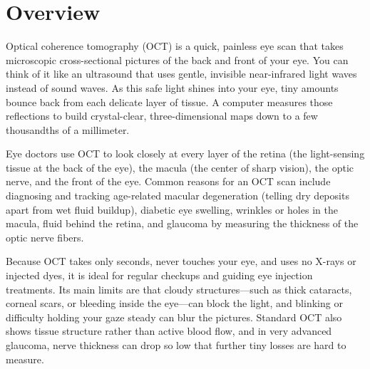 \label{ch:infographic-oct}

\section{Overview}

Optical coherence tomography (OCT) is a quick, painless eye scan that takes microscopic cross-sectional pictures of the back and front of your eye. You can think of it like an ultrasound that uses gentle, invisible near-infrared light waves instead of sound waves. As this safe light shines into your eye, tiny amounts bounce back from each delicate layer of tissue. A computer measures those reflections to build crystal-clear, three-dimensional maps down to a few thousandths of a millimeter.

Eye doctors use OCT to look closely at every layer of the retina (the light-sensing tissue at the back of the eye), the macula (the center of sharp vision), the optic nerve, and the front of the eye. Common reasons for an OCT scan include diagnosing and tracking age-related macular degeneration (telling dry deposits apart from wet fluid buildup), diabetic eye swelling, wrinkles or holes in the macula, fluid behind the retina, and glaucoma by measuring the thickness of the optic nerve fibers.

Because OCT takes only seconds, never touches your eye, and uses no X-rays or injected dyes, it is ideal for regular checkups and guiding eye injection treatments. Its main limits are that cloudy structures---such as thick cataracts, corneal scars, or bleeding inside the eye---can block the light, and blinking or difficulty holding your gaze steady can blur the pictures. Standard OCT also shows tissue structure rather than active blood flow, and in very advanced glaucoma, nerve thickness can drop so low that further tiny losses are hard to measure.


